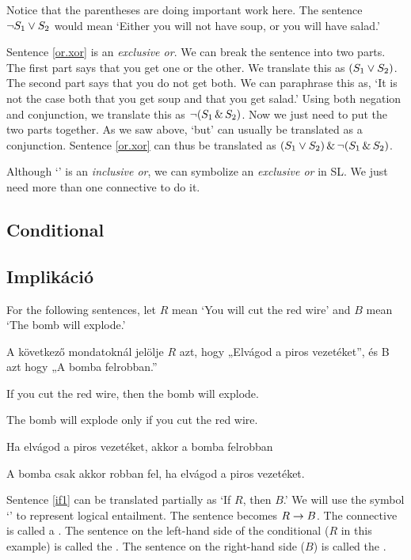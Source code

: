 Notice that the parentheses are doing important work here. The sentence $\neg S_1 \vee S_2$ would mean `Either you will not have soup, or you will have salad.'

Sentence \ref{or.xor} is an \emph{exclusive or}. We can break the sentence into two parts. The first part says that you get one or the other. We translate this as $(S_1 \vee S_2)$. The second part says that you do not get both. We can paraphrase this as, `It is not the case both that you get soup and that you get salad.' Using both negation and conjunction, we translate this as $\neg(S_1 \,\&\, S_2)$. Now we just need to put the two parts together. As we saw above, `but' can usually be translated as a conjunction. Sentence \ref{or.xor} can thus be translated as $(S_1 \vee S_2) \,\&\, \neg(S_1 \,\&\, S_2)$.

Although `\eor' is an \emph{inclusive or}, we can symbolize an \emph{exclusive or} in {SL}. We just need more than one connective to do it.

\subsection*{Conditional}
\subsection{Implikáció}

For the following sentences, let $R$ mean `You will cut the red wire' and $B$ mean `The bomb will explode.'

A következő mondatoknál jelölje $R$ azt, hogy „Elvágod a piros vezetéket”, és B azt hogy „A bomba felrobban.”

\begin{earg}
\item[\ex{if1}] If you cut the red wire, then the bomb will explode.
\item[\ex{if2}] The bomb will explode only if you cut the red wire.
\end{earg}

\begin{earg}
\item[\ex{if1}] Ha elvágod a piros vezetéket, akkor a bomba felrobban
\item[\ex{if2}] A bomba csak akkor robban fel, ha elvágod a piros vezetéket.
\end{earg}

Sentence \ref{if1} can be translated partially as `If $R$, then $B$.' We will use the symbol `\eif' to represent logical {entailment}. The sentence becomes $R\rightarrow B$. The connective is called a . The sentence on the left-hand side of the conditional ($R$ in this example) is called the . The sentence on the right-hand side ($B$) is called the .


